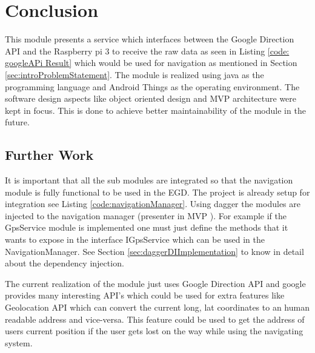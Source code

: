 \newpage
\chapter{Conclusion}
    This module presents a service which interfaces
    between the Google Direction API and the Raspberry pi 3
    to receive the raw data as seen in Listing 
    \ref{code: googleAPi Result} which would be 
    used for navigation
    as mentioned in Section \ref{sec:introProblemStatement}.
    The module is realized using java as the programming 
    language and Android Things \cite{androidThings} as the
    operating environment. The software design aspects like
    object oriented design and MVP \cite{mvp} architecture 
    were kept in focus. This is done to achieve  
    better maintainability of the module in the future.
   
\section{Further Work}
    It is important that all the sub modules are integrated
    so that the navigation module is fully functional to be used in the
    EGD. The project is already setup for integration see Listing 
    \ref{code:navigationManager}. Using dagger the modules are injected
    to the navigation manager (presenter in MVP \cite{mvp}). 
    For example if the
    GpsService module is implemented one must just define the methods
    that it wants to expose in the interface IGpsService 
    which can be used in the NavigationManager.
    See Section \ref{sec:daggerDIImplementation} to know in detail 
    about the dependency injection.
    
    The current realization of the module just uses Google Direction
    API \cite{googleDirecAPI} and google provides many interesting 
    API's which could be used for extra features like Geolocation API 
    which can convert the current long, lat coordinates to an 
    human readable address and vice-versa. This feature could be used to
    get the address of users current position if the user gets lost on 
    the way while using the navigating system.

